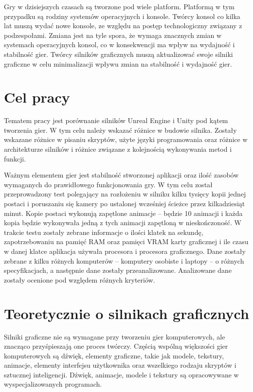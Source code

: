 \documentclass[12pt,twoside]{article}
\begin{document}
Gry w dzisiejszych czasach są tworzone pod wiele platform. Platformą w tym
przypadku są rodziny systemów operacyjnych i konsole. Twórcy konsol co kilka lat
muszą wydać nowe konsole, ze względu na postęp technologiczny związany z
podzespołami. Zmiana jest na tyle spora, że wymaga znacznych zmian w systemach
operacyjnych konsol, co w konsekwencji ma wpływ na wydajność i stabilność gier.
Twórcy silników graficznych muszą aktualizować swoje silniki graficzne w celu
minimalizacji wpływu zmian na stabilność i wydajność gier. 



\clearpage

\section{Cel pracy}

Tematem pracy jest porównanie silników Unreal Engine i Unity pod kątem tworzenia
gier.  W tym celu należy wskazać różnice w budowie silnika. Zostały wskazane
różnice w pisaniu skryptów,  użyte języki programowania oraz różnice w
architekturze silników i różnice związane z kolejnością wykonywania metod i
funkcji. 


Ważnym elementem gier jest stabilność stworzonej aplikacji oraz ilość zasobów
wymaganych do prawidłowego funkcjonowania gry. W tym celu został przeprowadzony
test polegający na rozłożeniu w silniku kilku tysięcy kopii jednej postaci i
poruszaniu się kamery po ustalonej wcześniej ścieżce przez kilkadziesiąt minut.
Kopie postaci wykonują zapętlone animacje -- będzie 10 animacji i każda kopia
będzie wykonywała jedną z tych animacji zapętloną w nieskończoność. W trakcie
testu zostały zebrane informacje o ilości klatek na sekundę,
zapotrzebowaniu na pamięć RAM oraz pamięci VRAM karty graficznej i ile czasu w danej klatce
aplikacja używała procesora i procesora graficznego. Dane zostały zebrane z
kilku różnych komputerów -- komputery osobiste i laptopy -- o różnych
specyfikacjach, a następnie dane zostały przeanalizowane. Analizowane dane
zostały ocenione pod względem różnych kryteriów.



\clearpage


\section{Teoretycznie o silnikach graficznych}

Silniki graficzne nie są wymagane przy tworzeniu gier komputerowych, ale
znacząco przyśpieszają one proces twórczy. Częścią wspólną większości gier
komputerowych są dźwięk, elementy graficzne, takie jak modele, tekstury,
animacje, elementy interfejsu użytkownika oraz wszelkiego rodzaju skryptów i
sztucznej inteligencji. Dźwięk, animacje, modele i tekstury są opracowywane w
wyspecjalizowanych programach. 
\end{document}
